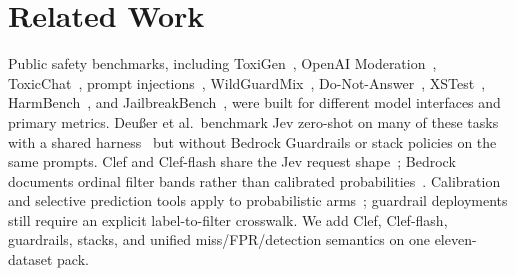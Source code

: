 \section{Related Work}
\label{sec:related}

Public safety benchmarks, including ToxiGen~\cite{hartvigsen2022toxigen}, OpenAI Moderation~\cite{markov2023holistic}, ToxicChat~\cite{lin2023toxicchat}, prompt injections~\cite{deepset2024promptinjections}, WildGuardMix~\cite{han2024wildguard}, Do-Not-Answer~\cite{wang2024donotanswer}, XSTest~\cite{rottger2024xstest}, HarmBench~\cite{mazeika2024harmbench}, and JailbreakBench~\cite{chao2024jailbreakbench}, were built for different model interfaces and primary metrics.
Deu{\ss}er et al.\ benchmark Jev zero-shot on many of these tasks with a shared harness~\cite{deusser2026jevbenchmark,appliedml2026jevbenchmarking} but without Bedrock Guardrails or stack policies on the same prompts.
Clef and Clef-flash share the Jev request shape~\cite{cloudflare2026clef,cloudflare2026clefflash}; Bedrock documents ordinal filter bands rather than calibrated probabilities~\cite{aws2024bedrockguardrails}.
Calibration and selective prediction tools apply to probabilistic arms~\cite{guo2017calibration,geifman2017selective}; guardrail deployments still require an explicit label-to-filter crosswalk.
We add Clef, Clef-flash, guardrails, stacks, and unified miss/FPR/detection semantics on one eleven-dataset pack.
